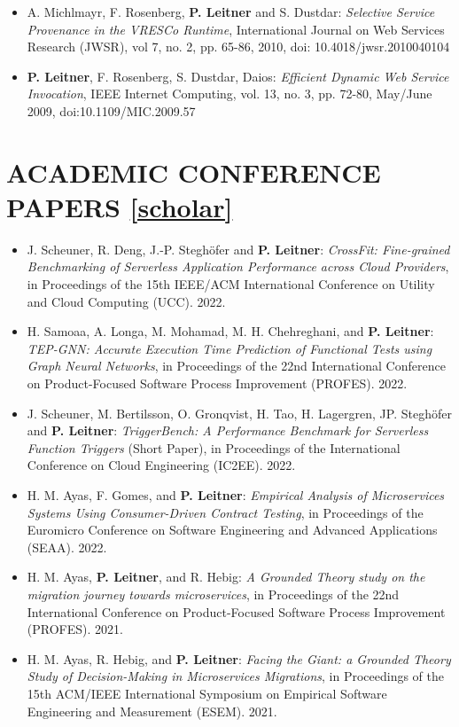 \documentclass[paper=letter,fontsize=11pt]{scrartcl} %
\newcommand{\NewPart}[2]{\section*{\uppercase{#1} #2}}
\begin{document}
\begin{itemize}
\item A. Michlmayr, F. Rosenberg, \textbf{P. Leitner} and S. Dustdar: \emph{Selective Service Provenance in the VRESCo Runtime}, International Journal on Web Services Research (JWSR), vol 7, no. 2, pp. 65-86, 2010, doi: 10.4018/jwsr.2010040104
\item \textbf{P. Leitner}, F. Rosenberg, S. Dustdar, Daios: \emph{Efficient Dynamic Web Service Invocation}, IEEE Internet Computing, vol. 13, no. 3, pp. 72-80, May/June 2009, doi:10.1109/MIC.2009.57
\end{itemize}

\NewPart{Academic Conference Papers}{\href{https://scholar.google.ch/citations?user=wZ9f8CAAAAAJ}{[scholar]}}

\begin{itemize}
  \item J. Scheuner, R. Deng, J.-P. Steghöfer and \textbf{P. Leitner}: \emph{CrossFit: Fine-grained Benchmarking of Serverless Application Performance across Cloud Providers}, in Proceedings of the 15th IEEE/ACM International Conference on Utility and Cloud Computing (UCC). 2022.
  \item H. Samoaa, A. Longa, M. Mohamad, M. H. Chehreghani, and \textbf{P. Leitner}: \emph{TEP-GNN: Accurate Execution Time Prediction of Functional Tests using Graph Neural Networks}, in Proceedings of the 22nd International Conference on Product-Focused Software Process Improvement (PROFES). 2022.
  \item  J. Scheuner, M. Bertilsson, O. Gronqvist, H. Tao, H. Lagergren, JP. Steghöfer and \textbf{P. Leitner}: \emph{TriggerBench: A Performance Benchmark for Serverless Function Triggers} (Short Paper), in Proceedings of the International Conference on Cloud Engineering (IC2EE). 2022.
  \item H. M. Ayas, F. Gomes, and \textbf{P. Leitner}: \emph{Empirical Analysis of Microservices Systems Using Consumer-Driven Contract Testing}, in Proceedings of the Euromicro Conference on Software Engineering and Advanced Applications (SEAA). 2022.
  \item H. M. Ayas, \textbf{P. Leitner}, and R. Hebig: \emph{A Grounded Theory study on the migration journey towards microservices}, in Proceedings of the 22nd International Conference on Product-Focused Software Process Improvement (PROFES). 2021.
  \item H. M. Ayas, R. Hebig, and \textbf{P. Leitner}: \emph{Facing the Giant: a Grounded Theory Study of Decision-Making in Microservices Migrations}, in Proceedings of the 15th ACM/IEEE International Symposium on Empirical Software Engineering and Measurement (ESEM). 2021.

\end{itemize}
\end{document}
